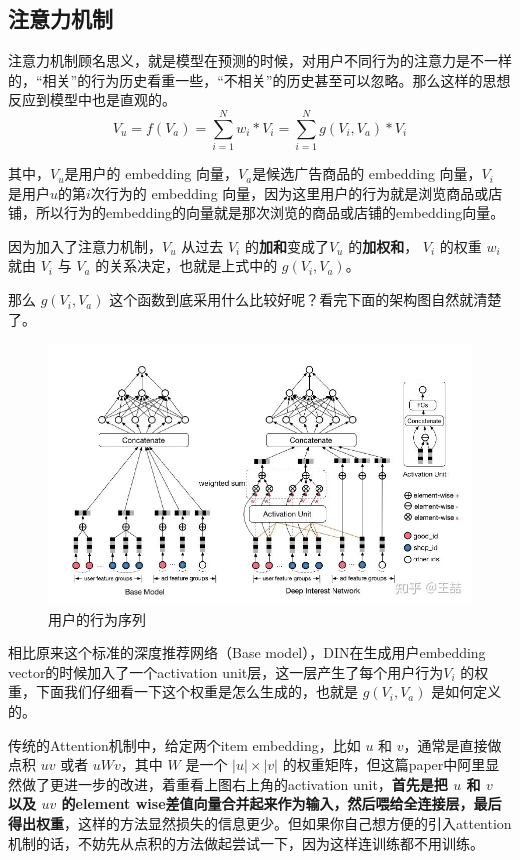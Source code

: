\documentclass[12pt]{article}
\begin{document}
\subsection{注意力机制}
注意力机制顾名思义，就是模型在预测的时候，对用户不同行为的注意力是不一样的，“相关”的行为历史看重一些，“不相关”的历史甚至可以忽略。那么这样的思想反应到模型中也是直观的。
$$
V_u  = f(V_a) = \sum_{i=1}^Nw_i * V_i = \sum_{i=1}^Ng(V_i, V_a) * V_i
$$

其中，$V_u$是用户的 embedding 向量，$V_a$是候选广告商品的 embedding 向量，$V_i$ 是用户$u$的第$i$次行为的 embedding 向量，因为这里用户的行为就是浏览商品或店铺，所以行为的embedding的向量就是那次浏览的商品或店铺的embedding向量。

因为加入了注意力机制，$V_u$ 从过去 $V_i$ 的\textbf{加和}变成了$V_u$ 的\textbf{加权和}， $V_i$ 的权重 $w_i$ 就由 $V_i$ 与 $V_a$ 的关系决定，也就是上式中的 $g(V_i, V_a)$。

那么 $g(V_i, V_a)$ 这个函数到底采用什么比较好呢？看完下面的架构图自然就清楚了。
\begin{figure}[H]
    \centering
    \includegraphics[width=1\textwidth]{fig/Ali_DIN_Structure.jpg}
    \caption{用户的行为序列}
\end{figure}

相比原来这个标准的深度推荐网络（Base model），DIN在生成用户embedding vector的时候加入了一个activation unit层，这一层产生了每个用户行为$V_i$ 的权重，下面我们仔细看一下这个权重是怎么生成的，也就是 $g(V_i, V_a)$ 是如何定义的。

传统的Attention机制中，给定两个item embedding，比如 $u$ 和 $v$，通常是直接做点积 $uv$ 或者 $uWv$，其中 $W$ 是一个 $|u|\times |v|$ 的权重矩阵，但这篇paper中阿里显然做了更进一步的改进，着重看上图右上角的activation unit，\textbf{首先是把 $u$ 和 $v$ 以及 $u v$ 的element wise差值向量合并起来作为输入，然后喂给全连接层，最后得出权重}，这样的方法显然损失的信息更少。但如果你自己想方便的引入attention机制的话，不妨先从点积的方法做起尝试一下，因为这样连训练都不用训练。
\end{document}
